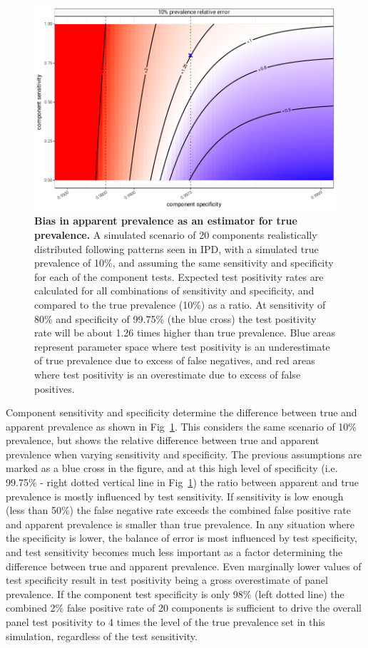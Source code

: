 \documentclass[10pt,letterpaper]{article}
\begin{document}
\begin{figure}[h!]
\centerline{\includegraphics{fig/impact-error-by-sensitivity-specificity.pdf}}
\caption{{\bf Bias in apparent prevalence as an estimator for true prevalence.}
A simulated scenario of 20 components realistically distributed following patterns seen in IPD, with a simulated true prevalence of 10\%, and assuming the same sensitivity and specificity for each of the component tests. Expected test positivity rates are calculated for all combinations of sensitivity and specificity, and compared to the true prevalence (10\%) as a ratio. At sensitivity of 80\% and specificity of 99.75\% (the blue cross) the test positivity rate will be about 1.26 times higher than true prevalence. Blue areas represent parameter space where test positivity is an underestimate of true prevalence due to excess of false negatives, and red areas where test positivity is an overestimate due to excess of false positives.}
\label{fig4}
\end{figure}

Component sensitivity and specificity determine the difference between true and apparent prevalence as shown in Fig~\ref{fig4}.  This considers the same scenario of 10\% prevalence, but shows the relative difference between true and apparent prevalence when varying sensitivity and specificity. The previous assumptions are marked as a blue cross in the figure, and at this high level of specificity (i.e. 99.75\% - right dotted vertical line in Fig~\ref{fig4}) the ratio between apparent and true prevalence is mostly influenced by test sensitivity. If sensitivity is low enough (less than 50\%) the false negative rate exceeds the combined false positive rate and apparent prevalence is smaller than true prevalence. In any situation where the specificity is lower, the balance of error is most influenced by test specificity, and test sensitivity becomes much less important as a factor determining the difference between true and apparent prevalence. Even marginally lower values of test specificity result in test positivity being a gross overestimate of panel prevalence. If the component test specificity is only 98\% (left dotted line) the combined 2\% false positive rate of 20 components is sufficient to drive the overall panel test positivity to 4 times the level of the true prevalence set in this simulation, regardless of the test sensitivity.
\end{document}
